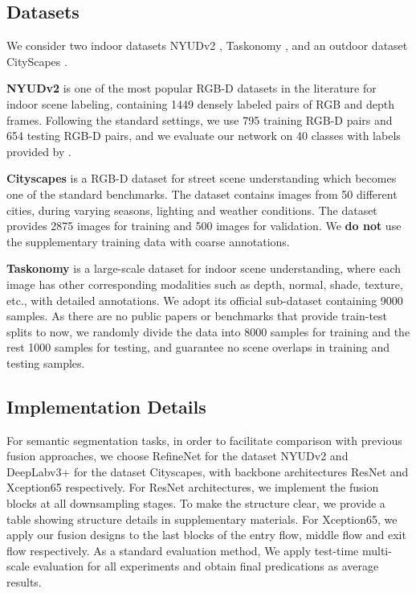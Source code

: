 \documentclass[sigconf]{acmart}
\begin{document}
\subsection{Datasets}
We consider  two indoor datasets NYUDv2 \cite{DBLP:conf/eccv/SilbermanHKF12}, Taskonomy \cite{DBLP:conf/cvpr/ZamirSSGMS18}, and an outdoor dataset CityScapes \cite{DBLP:conf/cvpr/CordtsORREBFRS16}.

\textbf{NYUDv2} is one of the most popular RGB-D datasets in the literature for  indoor scene labeling, containing 1449 densely labeled pairs of RGB and depth frames. Following the standard settings, we use 795 training RGB-D pairs and 654 testing RGB-D pairs, and we evaluate our network on 40 classes with labels provided by \cite{DBLP:conf/cvpr/GuptaAM13}.

\textbf{Cityscapes} is a RGB-D dataset for street scene understanding which becomes one of the standard benchmarks. The dataset contains images from 50 different cities, during varying seasons, lighting and weather conditions. The dataset provides 2875 images for training and 500 images for validation. We \textbf{do not} use the supplementary training data with coarse annotations.



\textbf{Taskonomy} is a large-scale dataset for indoor scene understanding, where each image has other corresponding modalities such as depth, normal, shade, texture, etc., with detailed annotations. We adopt its official sub-dataset containing 9000 samples. As there are no public papers or benchmarks that provide train-test splits to now, we randomly divide the data into 8000 samples for training and the rest 1000 samples for testing, and guarantee no scene overlaps in training and testing samples. 



\subsection{Implementation Details}
\label{sec:imple}
For semantic segmentation tasks, in order to facilitate comparison with previous fusion approaches, we choose RefineNet \cite{lin2019refinenet} for the dataset NYUDv2 and DeepLabv3+ \cite{DBLP:conf/eccv/ChenZPSA18} for the dataset Cityscapes, with backbone architectures ResNet \cite{DBLP:conf/cvpr/HeZRS16} and Xception65 \cite{DBLP:conf/cvpr/Chollet17} respectively. For ResNet architectures, we implement the fusion blocks at all downsampling stages. To make the structure clear, we provide a table showing structure details in supplementary materials. For Xception65, we apply our fusion designs to the last blocks of the entry flow, middle flow and exit flow respectively. As a standard evaluation method, We apply test-time multi-scale evaluation for all experiments and obtain final predications as average results. 
\end{document}
